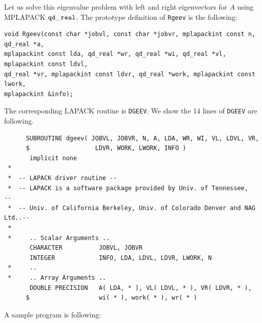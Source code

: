 \documentclass[12pt]{article}
\begin{document}
Let us solve this eigenvalue problem with left and right eigenvectors for $A$ using MPLAPACK $\tt qd\_real$.
The prototype definition of {\tt Rgeev} is the following:
\begin{verbatim}
void Rgeev(const char *jobvl, const char *jobvr, mplapackint const n, qd_real *a,
mplapackint const lda, qd_real *wr, qd_real *wi, qd_real *vl, mplapackint const ldvl,
qd_real *vr, mplapackint const ldvr, qd_real *work, mplapackint const lwork,
mplapackint &info);
\end{verbatim}
The corresponding LAPACK routine is {\tt DGEEV}. We show the 14 lines of {\tt DGEEV} are following.
\begin{verbatim}
      SUBROUTINE dgeev( JOBVL, JOBVR, N, A, LDA, WR, WI, VL, LDVL, VR,
      $                  LDVR, WORK, LWORK, INFO )
       implicit none
 *
 *  -- LAPACK driver routine --
 *  -- LAPACK is a software package provided by Univ. of Tennessee,    --
 *  -- Univ. of California Berkeley, Univ. of Colorado Denver and NAG Ltd..--
 *
 *     .. Scalar Arguments ..
       CHARACTER          JOBVL, JOBVR
       INTEGER            INFO, LDA, LDVL, LDVR, LWORK, N
 *     ..
 *     .. Array Arguments ..
       DOUBLE PRECISION   A( LDA, * ), VL( LDVL, * ), VR( LDVR, * ),
      $                   wi( * ), work( * ), wr( * )
\end{verbatim}
A sample program is following:
\end{document}
